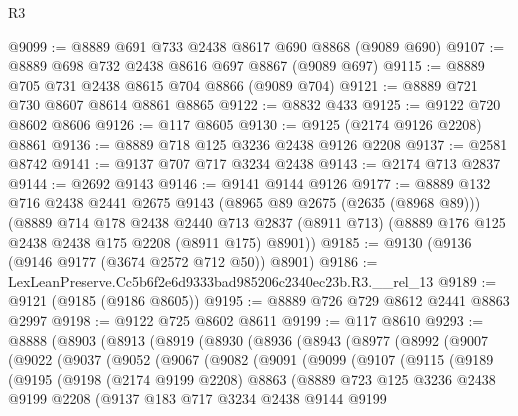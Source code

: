\begin{lexlean}{R3}
\begin{coremodule}
@9099 := @8889 @691 @733 @2438 @8617 @690 @8868 (@9089 @690)
@9107 := @8889 @698 @732 @2438 @8616 @697 @8867 (@9089 @697)
@9115 := @8889 @705 @731 @2438 @8615 @704 @8866 (@9089 @704)
@9121 := @8889 @721 @730 @8607 @8614 @8861 @8865
@9122 := @8832 @433
@9125 := @9122 @720 @8602 @8606
@9126 := @117 @8605
@9130 := @9125 (@2174 @9126 @2208) @8861
@9136 := @8889 @718 @125 @3236 @2438 @9126 @2208
@9137 := @2581 @8742
@9141 := @9137 @707 @717 @3234 @2438
@9143 := @2174 @713 @2837
@9144 := @2692 @9143
@9146 := @9141 @9144 @9126
@9177 := @8889
    @132
    @716
    @2438
    @2441
    @2675
    @9143
    (@8965 @89 @2675 (@2635 (@8968 @89)))
    (@8889
      @714
      @178
      @2438
      @2440
      @713
      @2837
      (@8911 @713)
      (@8889 @176 @125 @2438 @2438 @175 @2208 (@8911 @175) @8901))
@9185 := @9130 (@9136 (@9146 @9177 (@3674 @2572 @712 @50)) @8901)
@9186 := LexLeanPreserve.Cc5b6f2e6d9333bad985206c2340ec23b.R3.__rel_13
@9189 := @9121 (@9185 (@9186 @8605))
@9195 := @8889 @726 @729 @8612 @2441 @8863 @2997
@9198 := @9122 @725 @8602 @8611
@9199 := @117 @8610
@9293 := @8888
    (@8903
      (@8913
        (@8919
          (@8930
            (@8936
              (@8943
                (@8977
                  (@8992
                    (@9007
                      (@9022
                        (@9037
                          (@9052
                            (@9067
                              (@9082
                                (@9091
                                  (@9099
                                    (@9107
                                      (@9115
                                        (@9189
                                          (@9195
                                            (@9198
                                              (@2174 @9199 @2208)
                                              @8863
                                              (@8889
                                                @723
                                                @125
                                                @3236
                                                @2438
                                                @9199
                                                @2208
                                                (@9137
                                                  @183
                                                  @717
                                                  @3234
                                                  @2438
                                                  @9144
                                                  @9199

\end{coremodule}
\end{lexlean}
